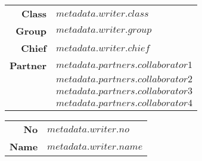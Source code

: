 \documentclass[12pt,a4paper,$if(lang)$$babel-lang$,$endif$]{ltjsarticle}
\begin{document}
\vspace{10mm}

\begin{table}[!h]
  \begin{flushright}
    \begin{tabular}{rl}
      \textbf{Class}   & \textbf{ $metadata.writer.class$ } \\
      \textbf{Group}   & \textbf{ $metadata.writer.group$ } \\
      \textbf{Chief}   & \textbf{ $metadata.writer.chief$ } \\
      \textbf{Partner} & \textbf{ $metadata.partners.collaborator1$ } \\
                       & \textbf{ $metadata.partners.collaborator2$ } \\
                       & \textbf{ $metadata.partners.collaborator3$ } \\
                       & \textbf{ $metadata.partners.collaborator4$ }
    \end{tabular}
  \end{flushright}
\end{table}

\vspace{15mm}

\begin{table}[!h]
  \begin{flushright}
    \begin{tabular}{rl}
      \textbf{No}   & \textbf{ $metadata.writer.no$ } \\
      \textbf{Name} & \textbf{ $metadata.writer.name$ }
    \end{tabular}
  \end{flushright}
\end{table}



\end{document}
